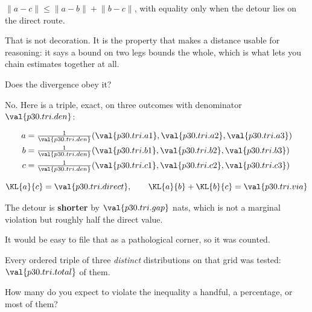 \begin{fr}

$\lVert a - c \rVert \le \lVert a - b \rVert + \lVert b - c \rVert$, with
equality only when the detour lies on the direct route.

That is not decoration. It is the property that makes a distance usable for
reasoning: it says a bound on two legs bounds the whole, which is what lets
you chain estimates together at all.

Does the divergence obey it?
\dotline
\nextframe
\end{fr}

\begin{fr}
\begin{ansblock}
No. Here is a triple, exact, on three outcomes with denominator
$\val{p30.tri.den}$:

\begin{align*}
  a &= \tfrac{1}{\val{p30.tri.den}}(\val{p30.tri.a1}, \val{p30.tri.a2},
       \val{p30.tri.a3}) \\
  b &= \tfrac{1}{\val{p30.tri.den}}(\val{p30.tri.b1}, \val{p30.tri.b2},
       \val{p30.tri.b3}) \\
  c &= \tfrac{1}{\val{p30.tri.den}}(\val{p30.tri.c1}, \val{p30.tri.c2},
       \val{p30.tri.c3})
\end{align*}

\[ \KL{a}{c} = \val{p30.tri.direct}, \qquad
   \KL{a}{b} + \KL{b}{c} = \val{p30.tri.via} \]

The detour is \textbf{shorter} \dash{} by $\val{p30.tri.gap}$ nats, which is
not a marginal violation but roughly half the direct value.
\end{ansblock}
\end{fr}

\begin{fr}
It would be easy to file that as a pathological corner, so it was counted.

Every ordered triple of three \emph{distinct} distributions on that grid was
tested: $\val{p30.tri.total}$ of them.

How many do you expect to violate the inequality \dash{} a handful, a
percentage, or most of them?
\dotline
\nextframe
\end{fr}

